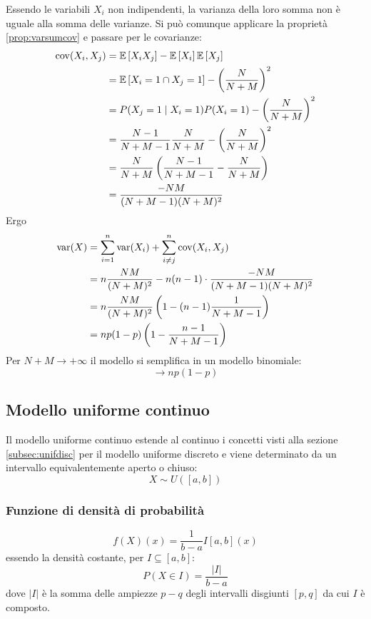 Essendo le variabili $X_i$ non indipendenti, la varianza della loro somma non è uguale alla somma delle varianze. Si può comunque applicare la proprietà \ref{prop:varsumcov} e passare per le covarianze:
\begin{align*}
	\operatorname{cov}(X_i,X_j) & = \mathbb{E}\left[ X_i X_j \right] - \mathbb{E}\left[ X_i \right]\mathbb{E}\left[ X_j \right]                                \\
	              & = \mathbb{E}\left[ X_i=1\cap X_j=1 \right] - \left(\frac{N}{N+M}\right)^2            \\
	              & = P(X_j=1 \mid X_i=1)P(X_i=1) - \left(\frac{N}{N+M}\right)^2     \\
	              & = \frac{N-1}{N+M-1} \frac{N}{N+M} - \left(\frac{N}{N+M}\right)^2 \\
	              & = \frac{N}{N+M} \left(\frac{N-1}{N+M-1} - \frac{N}{N+M}\right)   \\
	              & = \frac{-NM}{(N+M-1)(N+M)^2}
\end{align*}
Ergo
\begin{align*}
	\operatorname{var}(X) & = \sum_{i=1}^n \operatorname{var}(X_i) + \sum_{i\neq j}^n \operatorname{cov}(X_i,X_j)     \\
	        & = n\frac{NM}{(N+M)^2} - n(n-1)\cdot\frac{-NM}{(N+M-1)(N+M)^2} \\
	        & = n\frac{NM}{(N+M)^2}\left(1-(n-1)\frac{1}{N+M-1}\right)      \\
	        & = np(1-p)\left(1-\frac{n-1}{N+M-1}\right)
\end{align*}
Per $N+M\to+\infty$ il modello si semplifica in un modello binomiale:
\begin{equation*}
	\to np(1-p)
\end{equation*}


\subsection{Modello uniforme continuo}
Il modello uniforme continuo estende al continuo i concetti visti alla sezione \ref{subsec:unifdisc} per il modello uniforme discreto e viene determinato da un intervallo equivalentemente aperto o chiuso:
\begin{equation*}
	X \sim U([a,b])
\end{equation*}


\subsubsection{Funzione di densità di probabilità}
\begin{equation*}
	f(X)(x) = \frac{1}{b-a} I[a,b](x)
\end{equation*}
essendo la densità costante, per $I\subseteq[a,b]$:
\begin{equation*}
	P(X\in I) = \frac{|I|}{b-a}
\end{equation*}
dove $|I|$ è la somma delle ampiezze $p-q$ degli intervalli disgiunti $[p,q]$ da cui $I$ è composto.

